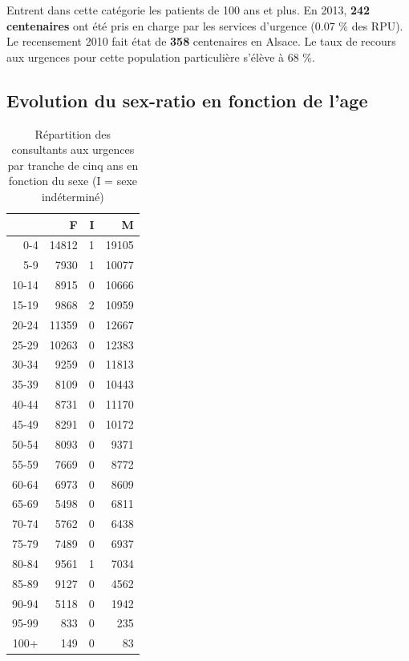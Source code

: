 \documentclass[12pt,english,french,twoside]{book}\usepackage[]{graphicx}\usepackage[]{color}
\begin{document}
Entrent dans cette catégorie les patients de 100 ans et plus. En 2013, \textbf{242 centenaires} ont été pris en charge par les services d'urgence (0.07  \% des RPU).  
Le recensement 2010 fait état de \textbf{358} centenaires en Alsace. Le taux de recours aux urgences pour cette population particulière s'élève à  68 \%.


\subsection*{Evolution du sex-ratio en fonction de l'age}




\begin{table}[ht]
\centering
\begin{tabular}{rrrr}
  \hline
 & F & I & M \\ 
  \hline
0-4 & 14812 &   1 & 19105 \\ 
  5-9 & 7930 &   1 & 10077 \\ 
  10-14 & 8915 &   0 & 10666 \\ 
  15-19 & 9868 &   2 & 10959 \\ 
  20-24 & 11359 &   0 & 12667 \\ 
  25-29 & 10263 &   0 & 12383 \\ 
  30-34 & 9259 &   0 & 11813 \\ 
  35-39 & 8109 &   0 & 10443 \\ 
  40-44 & 8731 &   0 & 11170 \\ 
  45-49 & 8291 &   0 & 10172 \\ 
  50-54 & 8093 &   0 & 9371 \\ 
  55-59 & 7669 &   0 & 8772 \\ 
  60-64 & 6973 &   0 & 8609 \\ 
  65-69 & 5498 &   0 & 6811 \\ 
  70-74 & 5762 &   0 & 6438 \\ 
  75-79 & 7489 &   0 & 6937 \\ 
  80-84 & 9561 &   1 & 7034 \\ 
  85-89 & 9127 &   0 & 4562 \\ 
  90-94 & 5118 &   0 & 1942 \\ 
  95-99 & 833 &   0 & 235 \\ 
  100+ & 149 &   0 &  83 \\ 
   \hline
\end{tabular}
\caption[]{Répartition des consultants aux urgences par tranche de cinq ans en fonction du sexe (I = sexe indéterminé)} 
\label{tab:sr2}
\end{table}
\end{document}
